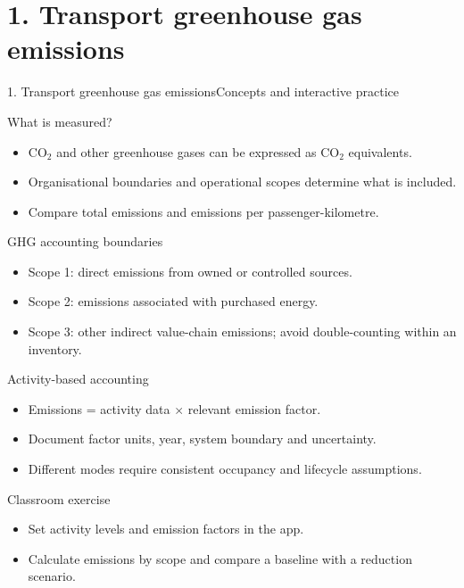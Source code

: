 \documentclass[aspectratio=169,11pt]{beamer}
\begin{document}
\section{1. Transport greenhouse gas emissions}
\begin{frame}{1. Transport greenhouse gas emissions}\centering\Large Concepts and interactive practice\end{frame}
\begin{frame}{What is measured?}\begin{itemize}
\item CO$_2$ and other greenhouse gases can be expressed as CO$_2$ equivalents.
\item Organisational boundaries and operational scopes determine what is included.
\item Compare total emissions and emissions per passenger-kilometre.
\end{itemize}\end{frame}
\begin{frame}{GHG accounting boundaries}\begin{itemize}
\item Scope 1: direct emissions from owned or controlled sources.
\item Scope 2: emissions associated with purchased energy.
\item Scope 3: other indirect value-chain emissions; avoid double-counting within an inventory.
\end{itemize}\end{frame}
\begin{frame}{Activity-based accounting}\begin{itemize}
\item Emissions = activity data $\times$ relevant emission factor.
\item Document factor units, year, system boundary and uncertainty.
\item Different modes require consistent occupancy and lifecycle assumptions.
\end{itemize}\end{frame}
\begin{frame}{Classroom exercise}\begin{itemize}
\item Set activity levels and emission factors in the app.
\item Calculate emissions by scope and compare a baseline with a reduction scenario.
\end{itemize}\end{frame}
\end{document}
